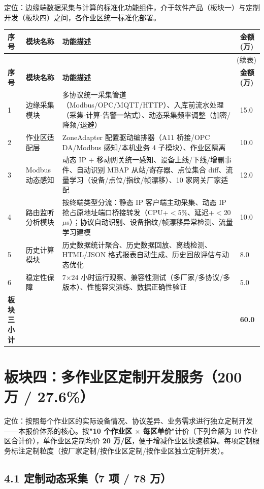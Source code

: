 \documentclass[11pt,a4paper]{ctexart}
\begin{document}
定位：边缘端数据采集与计算的标准化功能组件，介于软件产品（板块一）与定制开发（板块四）之间，各作业区统一标准化部署。

\begin{longtable}{p{1.2cm} p{3.6cm} p{7.3cm} p{1.7cm}}
\toprule
\textbf{序号} & \textbf{模块名称} & \textbf{功能描述} & \textbf{金额(万)} \\
\midrule
\endfirsthead
\midrule
\multicolumn{4}{r}{(续表)} \\
\toprule
\textbf{序号} & \textbf{模块名称} & \textbf{功能描述} & \textbf{金额(万)} \\
\midrule
\endhead
1 & 边缘采集模块 & 多协议统一采集管道（Modbus/OPC/MQTT/HTTP）、入库前流水处理（采集-计算-告警一站式）、动态采集频率调整（加密/降频/退避） & 15.0 \\
2 & 作业区适配层 & ZoneAdapter 配置驱动编排器（A11 桥接/OPC DA/Modbus 感知/本机业务 4 子模块）、作业区隔离 & 10.0 \\
3 & Modbus 动态感知 & 动态 IP + 移动网关统一感知、设备上线/下线/增删事件、自动识别 MBAP 从站/寄存器、点位集合 diff、流量学习（设备/点位/指纹/帧漂移）、10 家网关厂家适配 & 12.0 \\
4 & 路由监听分析模块 & 按终端类型分流：静态 IP 客户端主动采集、动态 IP 抢占原地址端口桥接转发（CPU+$<$5\%、延迟+$<$20$\mu$s）；协议自动识别、设备指纹/帧漂移异常检测、流量学习建模 & 10.0 \\
5 & 历史计算模块 & 历史数据统计聚合、历史数据回放、离线检测、HTML/JSON 格式报表自动生成、历史回放评估与动态优化 & 8.0 \\
6 & 稳定性保障 & 7$\times$24 小时运行观察、兼容性测试（多厂家/多协议/多版本）、性能容灾演练、数据正确性验证 & 5.0 \\
\midrule
\textbf{板块三小计} & & & \textbf{60.0} \\
\bottomrule
\end{longtable}

\section{板块四：多作业区定制开发服务（200 万 / 27.6\%）}

定位：按照每个作业区的实际设备情况、协议差异、业务需求进行独立定制开发——本报价体系的核心。按\textbf{"10 个作业区 $\times$ 每区单价"}计价（下列金额为 10 作业区合计价），单作业区定制均价 \textbf{20 万/区}，便于增减作业区快速核算。每项定制服务标注定制粒度（按厂家定制/按作业区定制/按作业区独立定制开发）。

\subsection{4.1 定制动态采集（7 项 / 78 万）}
\end{document}
